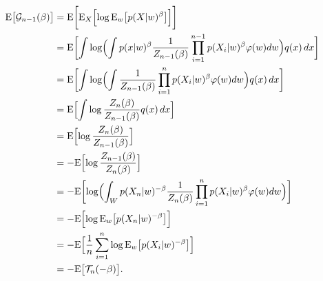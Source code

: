 \documentclass[11pt,a4paper]{jsarticle}
\newcommand{\E}{\mathrm{E}}
\begin{document}
\begin{align}
\E \bigl[ \mathcal{G}_{n-1} (\beta) \bigr]
& =
\E \biggl[ \E_X \Bigl[ \log \E_w \bigl[ p (X | w)^{\beta} \bigr] \Bigr] \biggr] \nonumber \\
& =
\E \biggl[ \int
\log \Bigl( \int p (x | w)^{\beta} \frac{1}{Z_{n-1} (\beta)} \prod_{i=1}^{n-1} p (X_i | w)^{\beta} \varphi (w) d w
\Bigr) q(x) \, d x \biggr] \nonumber \\
& =
\E \biggl[ \int
\log \Bigl( \int \frac{1}{Z_{n-1} (\beta)} \prod_{i=1}^n p (X_i | w)^{\beta} \varphi (w) d w
\Bigr) q(x) \, d x \biggr] \nonumber \\
& =
\E \Bigl[ \int \log \frac{Z_n (\beta)}{Z_{n-1} (\beta)} q(x) \, d x \Bigr] \nonumber \\
& =
\E \Bigl[ \log \frac{Z_n (\beta)}{Z_{n-1} (\beta)} \Bigr] \nonumber \\
& =
- \E \Bigl[ \log \frac{Z_{n-1} (\beta)}{Z_n (\beta)} \Bigr] \nonumber \\
& =
- \E \biggl[
\log \Bigl(
\int_W p (X_n | w)^{-\beta} \frac{1}{Z_n (\beta)} \prod_{i=1}^n p (X_i | w)^{\beta} \varphi (w) d w
\Bigr) \biggr] \nonumber \\
& =
- \E \Bigl[ \log \E_w \bigl[ p (X_n | w)^{-\beta} \bigr] \Bigr] \nonumber \\
& =
- \E \Bigl[ \frac{1}{n} \sum_{i=1}^n \log \E_w \bigl[ p (X_i | w)^{-\beta} \bigr] \Bigr] \nonumber \\
& =
- \E \bigl[ \mathcal{T}_n (-\beta) \bigr]. \nonumber
\end{align}
\end{document}
